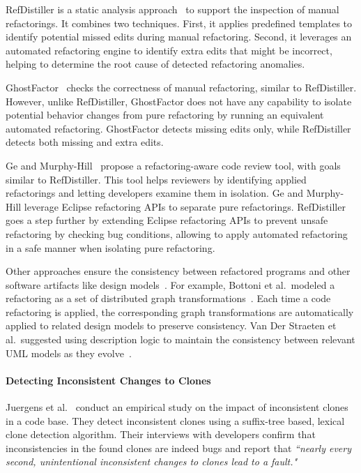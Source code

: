 \documentclass[runningheads,a4paper]{llncs}
\begin{document}
RefDistiller is a static analysis approach~\cite{Alves2017:refdistiller,Alves:2014:RRA:2635868.2661674} to support the inspection of manual refactorings. It combines two techniques. First, it applies predefined templates to identify potential missed edits during manual refactoring. Second, it leverages an automated refactoring engine to identify extra edits that might be incorrect, helping to  determine the root cause of detected refactoring anomalies.

GhostFactor~\cite{geManual2014} checks the correctness of manual refactoring, similar to RefDistiller. 
However, unlike RefDistiller, GhostFactor does not have any capability to isolate potential behavior changes from pure refactoring by running an equivalent automated refactoring. GhostFactor detects missing edits only, while RefDistiller detects both missing and extra edits. 

Ge and Murphy-Hill~\cite{ge2014towards} propose a refactoring-aware code review tool, with goals similar to RefDistiller. This tool helps reviewers by identifying applied refactorings and letting developers examine them in isolation. Ge and Murphy-Hill leverage Eclipse refactoring APIs to separate pure refactorings. RefDistiller goes a step further by extending Eclipse refactoring APIs to prevent unsafe refactoring by checking bug conditions, allowing to apply automated refactoring in a safe manner when isolating pure refactoring. 


Other approaches ensure the consistency between refactored programs and other software artifacts like design models~\cite{Bottoni2003:coordinatedTransformation,Straeten2003:UML}. For example, Bottoni et al.~modeled a refactoring as a set of distributed graph transformations~\cite{Bottoni2003:coordinatedTransformation}. Each time a code refactoring is applied, the corresponding graph transformations are automatically applied to related design models to preserve consistency. Van Der Straeten et al.~suggested using description logic to maintain the consistency between relevant UML models as they evolve~\cite{Straeten2003:UML}.


\paragraph{\bf Detecting Inconsistent Changes to Clones} 
Juergens et al.~\cite{Juergens2009:clone-bug} conduct an empirical
study on the impact of inconsistent clones in a code base. They detect
inconsistent clones using a suffix-tree based, lexical clone detection
algorithm. Their interviews with developers confirm that
inconsistencies in the found clones are indeed bugs and report that
{\em ``nearly every second, unintentional inconsistent changes to
  clones lead to a fault."}
\end{document}
